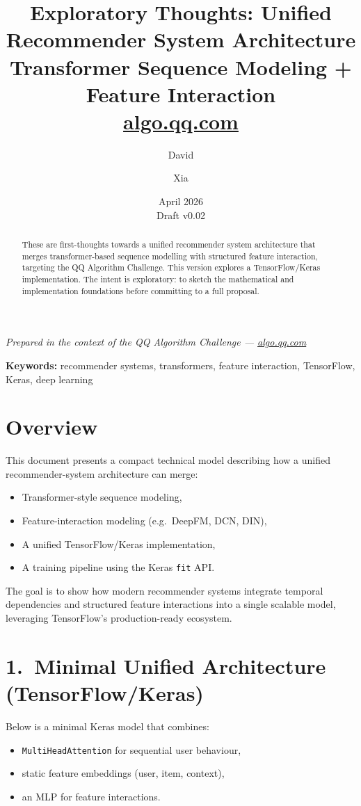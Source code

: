 \documentclass[12pt]{article}
\title{Exploratory Thoughts: Unified Recommender System Architecture\\
\large Transformer Sequence Modeling + Feature Interaction\\
\normalsize \href{https://algo.qq.com/\#intro}{algo.qq.com}}
\author{David \and Xia}
\date{April 2026 \\ \small Draft v0.02}
\begin{document}
\maketitle

\begin{center}
    \small\textit{Prepared in the context of the QQ Algorithm Challenge ---
    \href{https://algo.qq.com/\#intro}{algo.qq.com}}
\end{center}

\begin{abstract}
These are first-thoughts towards a unified recommender system architecture
that merges transformer-based sequence modelling with structured feature
interaction, targeting the QQ Algorithm Challenge. This version explores a
TensorFlow/Keras implementation. The intent is exploratory: to sketch the
mathematical and implementation foundations before committing to a full
proposal.
\end{abstract}

\noindent\textbf{Keywords:} recommender systems, transformers, feature interaction, TensorFlow, Keras, deep learning

\bigskip

\section{Overview}
This document presents a compact technical model describing how a unified
recommender-system architecture can merge:
\begin{itemize}
    \item Transformer-style sequence modeling,
    \item Feature-interaction modeling (e.g.\ DeepFM, DCN, DIN),
    \item A unified TensorFlow/Keras implementation,
    \item A training pipeline using the Keras \texttt{fit} API.
\end{itemize}

The goal is to show how modern recommender systems integrate temporal
dependencies and structured feature interactions into a single scalable model,
leveraging TensorFlow's production-ready ecosystem.

\section{1.\ Minimal Unified Architecture (TensorFlow/Keras)}
Below is a minimal Keras model that combines:
\begin{itemize}
    \item \texttt{MultiHeadAttention} for sequential user behaviour,
    \item static feature embeddings (user, item, context),
    \item an MLP for feature interactions.
\end{itemize}
\end{document}
